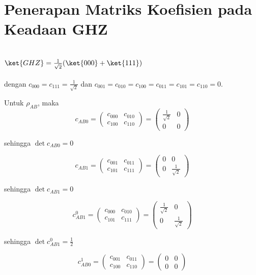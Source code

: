 \section{Penerapan Matriks Koefisien pada Keadaan GHZ}
\subsection{$\ket{GHZ}=\frac{1}{\sqrt{2}}(\ket{000}+\ket{111})$}
dengan $c_{000}=c_{111}=\frac{1}{\sqrt{2}}$ dan $c_{001}=c_{010}=c_{100}=c_{011}=c_{101}=c_{110}=0$.

Untuk $\rho_{AB}$, maka
\begin{equation}
	c_{AB0}=
	\begin{pmatrix}
		c_{000} & c_{010} \\
		c_{100} & c_{110}
	\end{pmatrix}=
	\begin{pmatrix}
		\frac{1}{\sqrt{2}} & 0 \\
		0 & 0
	\end{pmatrix}
\end{equation}

sehingga $\det c_{AB0} = 0$

\begin{equation}
	c_{AB1}=
	\begin{pmatrix}
		c_{001} & c_{011} \\
		c_{101} & c_{111}
	\end{pmatrix}=
	\begin{pmatrix}
		0 & 0 \\
		0 & \frac{1}{\sqrt{2}}
	\end{pmatrix}
\end{equation}

sehingga $\det c_{AB1} = 0$

\begin{equation}
	c_{AB1}^0=
	\begin{pmatrix}
		c_{000} & c_{010} \\
		c_{101} & c_{111}
	\end{pmatrix}=
	\begin{pmatrix}
		\frac{1}{\sqrt{2}} & 0 \\
		0 & \frac{1}{\sqrt{2}}
	\end{pmatrix}
\end{equation}

sehingga $\det c_{AB1}^0 = \frac{1}{2}$

\begin{equation}
	c_{AB0}^1=
	\begin{pmatrix}
		c_{001} & c_{011} \\
		c_{100} & c_{110}
	\end{pmatrix}=
	\begin{pmatrix}
		0 & 0 \\
		0 & 0
	\end{pmatrix}
\end{equation}

